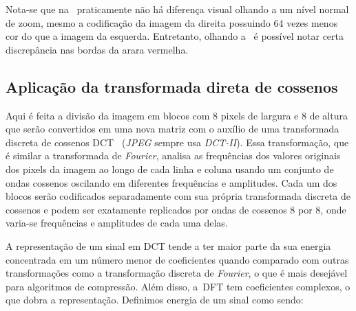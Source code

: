 Nota-se que na~ praticamente não há diferença visual olhando a um nível normal de zoom, mesmo a codificação da imagem da direita possuindo 64 vezes menos cor do que a imagem da esquerda. Entretanto, olhando a~ é possível notar certa discrepância nas bordas da arara vermelha.

\subsection{Aplicação da transformada direta de cossenos}
Aqui é feita a divisão da imagem em blocos com 8 pixels de largura e 8 de altura que serão convertidos em uma nova matriz com o auxílio de uma transformada discreta de cossenos \acrshort{DCT}~\cite{ahmed1974discrete} (\textit{JPEG} sempre usa \emph{DCT-II}). Essa transformação, que é similar a transformada de \textit{Fourier}, analisa as frequências dos valores originais dos pixels da imagem ao longo de cada linha e coluna usando um conjunto de ondas cossenos oscilando em diferentes frequências e amplitudes. Cada um dos blocos serão codificados separadamente com sua própria transformada discreta de cossenos e podem ser exatamente replicados por ondas de cossenos 8 por 8, onde varia-se frequências e amplitudes de cada uma delas. 

A representação de um sinal em \acrshort{DCT} tende a ter maior parte da sua energia concentrada em um número menor de coeficientes quando comparado com outras transformações como a transformação discreta de \textit{Fourier}, o que é mais desejável para algoritmos de compressão. Além disso, a~\acrshort{DFT} tem coeficientes complexos, o que dobra a representação. Definimos energia de um sinal como sendo: 

